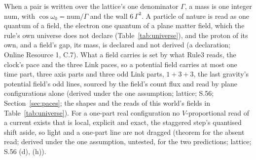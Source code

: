 \documentclass[pdflatex,sn-mathphys-num]{sn-jnl}
\newcommand{\num}{\mathrm{num}}
\theoremstyle{thmstyleone}
\theoremstyle{thmstyletwo}
\begin{document}
When a pair is written over the lattice's one denominator $\Gamma$, a mass is one integer $\num$, with $\cos\omega_0 = \num / \Gamma$ and the wall $6\,\Gamma^3$. A particle of nature is read as one quantum of a field, the electron one quantum of a plane matter field, which the rule's own universe does not declare (Table~\ref{tab:universe}), and the proton of its own, and a field's gap, its mass, is declared and not derived (a declaration; Online Resource 1, C.7). What a field carries is set by what Rule3 reads, the clock's pace and the three Link paces, so a potential field carries at most one time part, three axis parts and three odd Link parts, $1 + 3 + 3$, the last gravity's potential field's odd lines, sourced by the field's count flux and read by plane configurations alone (derived under the one assumption; lattice; S.56; Section~\ref{sec:paces}; the shapes and the reads of this world's fields in Table~\ref{tab:universe}). For a one-part real configuration no $V$-proportional read of a current exists that is local, explicit and exact, the staggered step's quantised shift aside, so light and a one-part line are not dragged (theorem for the absent read; derived under the one assumption, untested, for the two predictions; lattice; S.56 (d), (h)).
\end{document}
